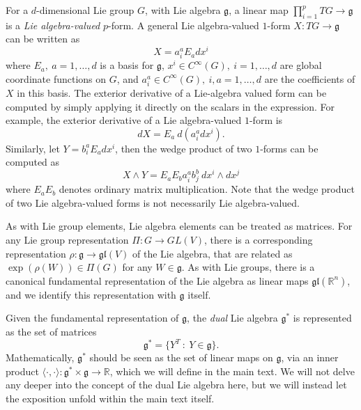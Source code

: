 For a $d$-dimensional Lie group $G$, with Lie algebra $\mathfrak{g}$, a linear map $\prod_{i=1}^p TG \to \mathfrak{g}$ is a \textit{Lie algebra-valued} $p$-form. A general Lie algebra-valued $1$-form $X : TG \to \mathfrak{g}$ can be written as
\begin{equation}
X = a_i^a E_a dx^i
\end{equation}
where $E_a,\ a=1,\dots,d$ is a basis for $\mathfrak{g}$, $x^i \in C^\infty(G),\ i=1,\dots,d$ are global coordinate functions on $G$, and $a_i^a \in C^\infty(G),\ i,a=1,\dots,d$ are the coefficients of $X$ in this basis. The exterior derivative of a Lie-algebra valued form can be computed by simply applying it directly on the scalars in the expression. For example, the exterior derivative of a Lie algebra-valued $1$-form is
\begin{equation}
dX = E_a\ d(a_i^a dx^i).
\end{equation}
Similarly, let $Y = b_i^a E_a dx^i$, then the wedge product of two $1$-forms can be computed as
\begin{equation}
X \wedge Y = E_a E_b a_i^a b_j^b\ dx^i \wedge dx^j
\end{equation}
where $E_a E_b$ denotes ordinary matrix multiplication. Note that the wedge product of two Lie algebra-valued forms is not necessarily Lie algebra-valued.

As with Lie group elements, Lie algebra elements can be treated as matrices. For any Lie group representation $\Pi : G \to GL(V)$, there is a corresponding representation $\rho : \mathfrak{g} \to \mathfrak{gl}(V)$ of the Lie algebra, that are related as $\exp(\rho(W)) \in \Pi(G)$ for any $W \in \mathfrak{g}$. As with Lie groups, there is a canonical fundamental representation of the Lie algebra as linear maps $\mathfrak{gl}(\mathbb{R}^{n})$, and we identify this representation with $\mathfrak{g}$ itself.

Given the fundamental representation of $\mathfrak{g}$, the \textit{dual} Lie algebra $\mathfrak{g}^*$ is represented as the set of matrices \citep{hallLieGroupsLie2015}
\begin{equation}
\mathfrak{g}^* = \{ Y^T\ :\ Y \in \mathfrak{g} \}.
\end{equation}
Mathematically, $\mathfrak{g}^*$ should be seen as the set of linear maps on $\mathfrak{g}$, via an inner product $\langle \cdot, \cdot \rangle : \mathfrak{g}^* \times \mathfrak{g} \to \mathbb{R}$, which we will define in the main text. We will not delve any deeper into the concept of the dual Lie algebra here, but we will instead let the exposition unfold within the main text itself.

